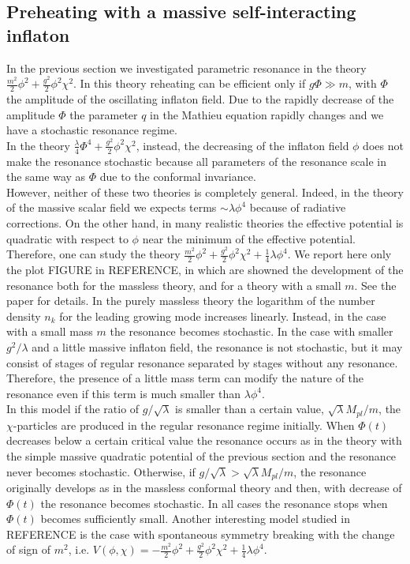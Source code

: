 \documentclass[11pt,a4paper,twoside]{book}
\begin{document}
\subsection{Preheating with a massive self-interacting inflaton}
In the previous section we investigated parametric resonance in the theory $ \frac{m^{2}}{2}\phi^{2} + \frac{g^{2}}{2}\phi^{2}\chi^{2} $. In this theory reheating can be efficient only if $ g\Phi \gg m $, with $\Phi$ the amplitude of the oscillating inflaton field. Due to the rapidly decrease of the amplitude $\Phi$ the parameter $ q $ in the Mathieu equation rapidly changes and we have a stochastic resonance regime.\\
In the theory $ \frac{\lambda}{4}\Phi^{4} + \frac{g^{2}}{2}\phi^{2}\chi^{2} $, instead, the decreasing of the inflaton field $\phi$ does not make the resonance stochastic because all parameters of the resonance scale in the same way as $\Phi$ due to the conformal invariance.\\
However, neither of these two theories is completely general. Indeed, in the theory of the massive scalar field we expects terms $\sim \lambda \phi^{4}$ because of radiative corrections. On the other hand, in many realistic theories the effective potential is quadratic with respect to $\phi$ near the minimum of the effective potential. Therefore, one can study the theory  $\frac{m^{2}}{2}\phi^{2} + \frac{g^{2}}{2}\phi^{2}\chi^{2} +\frac{1}{4} \lambda \phi^{4} $. We report here only the plot FIGURE in REFERENCE, in which are showned the development of the resonance both for the massless theory, and for a theory with a small $ m $. See the paper for details. In the purely massless theory the logarithm of the number density $ n_{k} $ for the leading growing mode increases linearly. Instead, in the case with a small mass $ m $ the resonance becomes stochastic. In the case with smaller $ g^{2}/\lambda $  and a little massive inflaton field, the resonance is not stochastic, but it may consist of stages of regular resonance separated by stages without any resonance. Therefore, the presence of a little mass term can modify the nature of the resonance even if this term is much smaller than $ \lambda \phi^{4} $.\\
In this model if the ratio of $ g/\sqrt{\lambda} $ is smaller than a certain value, $ \sqrt{\lambda}M_{pl}/m $, the $\chi$-particles are produced in the regular resonance regime initially. When $ \Phi(t) $ decreases below a certain critical value  the resonance occurs as in the theory with  the simple massive quadratic potential of the previous section and the resonance never becomes stochastic. Otherwise, if $g/\sqrt{\lambda} > \sqrt{\lambda}M_{pl}/m $, the resonance originally develops as in the massless conformal theory and then, with decrease of $ \Phi(t) $ the resonance becomes stochastic. In all cases the resonance stops when $ \Phi(t) $ becomes sufficiently small. Another interesting model studied in REFERENCE is the case with spontaneous symmetry breaking with the change of sign of $ m^{2} $, i.e.  $V(\phi,\chi)= -\frac{m^{2}}{2}\phi^{2} + \frac{g^{2}}{2}\phi^{2}\chi^{2} +\frac{1}{4} \lambda \phi^{4} $.
\end{document}
